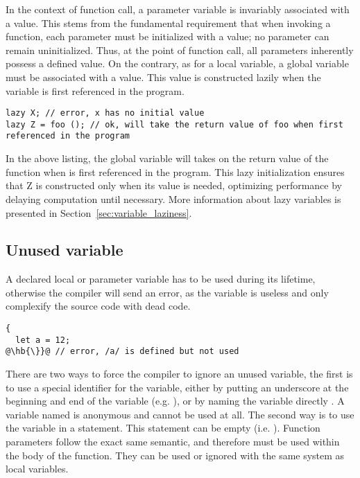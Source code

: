 In the context of function call, a parameter variable is invariably associated
with a value. This stems from the fundamental requirement that when invoking a
function, each parameter must be initialized with a value; no parameter can
remain uninitialized. Thus, at the point of function call, all parameters
inherently possess a defined value. On the contrary, as for a local variable, a
global variable must be associated with a value. This value is constructed
lazily when the variable is first referenced in the program.

\begin{lstlisting}[style=coloredverbatim]
lazy X; // error, x has no initial value
lazy Z = foo (); // ok, will take the return value of foo when first referenced in the program
\end{lstlisting}

In the above listing, the global variable  will takes on the return
value of the function  when  is first referenced in the
program. This lazy initialization ensures that Z is constructed only when its
value is needed, optimizing performance by delaying computation until necessary.
More information about lazy variables is presented in
Section~\ref{sec:variable_laziness}.

\subsection{Unused variable}
\label{sec:unused_variables}

A declared local or parameter variable has to be used during its lifetime,
otherwise the compiler will send an error, as the variable is useless and only
complexify the source code with dead code.

\begin{lstlisting}[style=coloredverbatim, escapechar=@]
{
  let a = 12;
@\hb{\}}@ // error, /a/ is defined but not used
\end{lstlisting}

There are two ways to force the compiler to ignore an unused variable, the first
is to use a special identifier for the variable, either by putting an underscore
at the beginning and end of the variable (e.g. ), or by naming the
variable directly \token{\_}. A variable named \token{\_} is anonymous and
cannot be used at all. The second way is to use the variable in a statement.
This statement can be empty (i.e. ). Function parameters follow the
exact same semantic, and therefore must be used within the body of the function.
They can be used or ignored with the same system as local variables.

